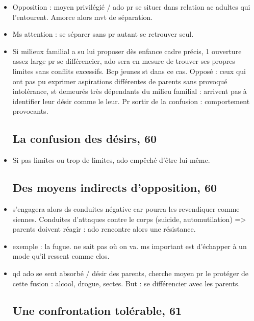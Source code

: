 \documentclass[12pt]{report}
\begin{document}
\begin{itemize}
\item Opposition : moyen privilégié / ado pr se situer dans relation ac adultes qui l'entourent. Amorce alors mvt de séparation.\\

 \item Ms attention : se séparer sans pr autant se retrouver seul. \\
 
 \item Si milieux familial a su lui  proposer dès enfance cadre précis, 1 ouverture assez large pr se différencier, ado sera en mesure de trouver ses propres limites sans conflits excessifs. Bcp jeunes st dans ce cas. Opposé : ceux qui ont pas pu exprimer aspirations différentes de parents sans provoqué intolérance, st demeurés très dépendants du milieu familial : arrivent pas à identifier leur désir comme le leur. Pr sortir de la confusion :  comportement provocants.
 

\subsection{La confusion des désirs, 60}

\item Si pas limites ou trop de limites, ado empêché d'être lui-même.

\subsection{Des moyens indirects d'opposition, 60}

\item s'engagera alors ds conduites négative car pourra les revendiquer comme siennes. Conduites d'attaques contre le corps (suicide, automutilation) => parents doivent réagir : ado rencontre alors une résistance.\\

\item exemple : la fugue. ne sait pas où on va. ms important est d'échapper à un mode qu'il ressent comme clos.\\

\item qd ado se sent absorbé / désir des parents, cherche moyen pr le protéger de cette fusion : alcool, drogue, sectes. But : se différencier avec les parents. \\

\subsection{Une confrontation tolérable, 61}



\end{itemize}
\end{document}
